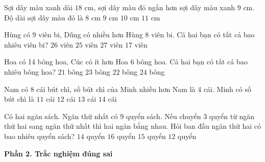 \begin{ex} %
Sợi dây màu xanh dài $18\text{ cm}$, sợi dây màu đỏ ngắn hơn sợi dây màu xanh $9\text{ cm}$. Độ dài sợi dây màu đỏ là
\choice
{$8\text{ cm}$}
{\True $9\text{ cm}$}
{$10\text{ cm}$}
{$11\text{ cm}$}
\end{ex}

\begin{ex} %
Hùng có 9 viên bi, Dũng có nhiều hơn Hùng 8 viên bi. Cả hai bạn có tất cả bao nhiêu viên bi?
\choice
{\True $26$ viên}
{$25$ viên}
{$27$ viên}
{$17$ viên}
\end{ex}

\begin{ex} %
Hoa có 14 bông hoa, Cúc có ít hơn Hoa 6 bông hoa. Cả hai bạn có tất cả bao nhiêu bông hoa?
\choice
{$21$ bông}
{$23$ bông}
{\True $22$ bông}
{$24$ bông}
\end{ex}

\begin{ex} %
Nam có 8 cái bút chì, số bút chì của Minh nhiều hơn Nam là 4 cái. Minh có số bút chì là
\choice
{$11$ cái}
{\True $12$ cái}
{$13$ cái}
{$14$ cái}
\end{ex}

\begin{ex} %
Có hai ngăn sách. Ngăn thứ nhất có 9 quyển sách. Nếu chuyển 3 quyển từ ngăn thứ hai sang ngăn thứ nhất thì hai ngăn bằng nhau. Hỏi ban đầu ngăn thứ hai có bao nhiêu quyển sách?
\choice
{$14$ quyển}
{$16$ quyển}
{\True $15$ quyển}
{$12$ quyển}
\end{ex}

\textbf{Phần 2. Trắc nghiệm đúng sai}

